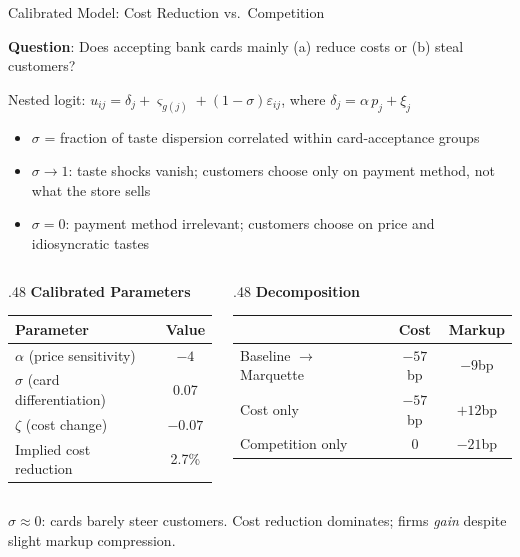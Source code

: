 \documentclass[11pt, aspectratio=169]{beamer}
\begin{document}
\begin{frame}{Calibrated Model: Cost Reduction vs.\ Competition}

\small
\textbf{Question}: Does accepting bank cards mainly (a) reduce costs or (b) steal customers?

\vspace{0.3em}
Nested logit: \quad $u_{ij} = \delta_j + \varsigma_{g(j)} + (1-\sigma)\varepsilon_{ij}$, \quad where $\delta_j = \alpha \, p_j + \xi_j$

\begin{itemize}\setlength\itemsep{0.1em}
    \item $\sigma$ = fraction of taste dispersion correlated within card-acceptance groups
    \item $\sigma \to 1$: taste shocks vanish; customers choose only on payment method, not what the store sells
    \item $\sigma = 0$: payment method irrelevant; customers choose on price and idiosyncratic tastes
\end{itemize}

\vspace{0.3em}

\begin{columns}[T]
\begin{column}{.48\textwidth}
\centering
\textbf{Calibrated Parameters}
\begin{tabular}{lc}
\toprule
Parameter & Value \\
\midrule
$\alpha$ (price sensitivity) & $-4$ \\
$\sigma$ (card differentiation) & 0.07 \\
$\zeta$ (cost change) & $-0.07$ \\
\midrule
Implied cost reduction & 2.7\% \\
\bottomrule
\end{tabular}
\end{column}
\begin{column}{.48\textwidth}
\centering
\textbf{Decomposition}
\begin{tabular}{lcc}
\toprule
 & Cost & Markup \\
\midrule
Baseline $\to$ Marquette & $-57$bp & $-9$bp \\
Cost only & $-57$bp & $+12$bp \\
Competition only & 0 & $-21$bp \\
\bottomrule
\end{tabular}
\end{column}
\end{columns}

\vfill
\small $\sigma \approx 0$: cards barely steer customers. Cost reduction dominates; firms \emph{gain} despite slight markup compression.

\end{frame}
\end{document}
